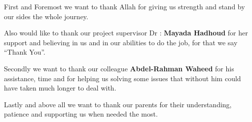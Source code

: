 First and Foremost we want to thank Allah for giving us strength and stand by our sides the whole journey.

Also would like to thank our project supervisor Dr : \textbf{Mayada Hadhoud} for her support and believing in us and in our abilities to do the job, for that we say ``Thank You''.

Secondly we want to thank our colleague \textbf{Abdel-Rahman Waheed} for his assistance, time and for helping us solving some issues that without him could have taken much longer to deal with.

Lastly and above all we want to thank our parents for their understanding, patience and supporting us when needed the most.

 